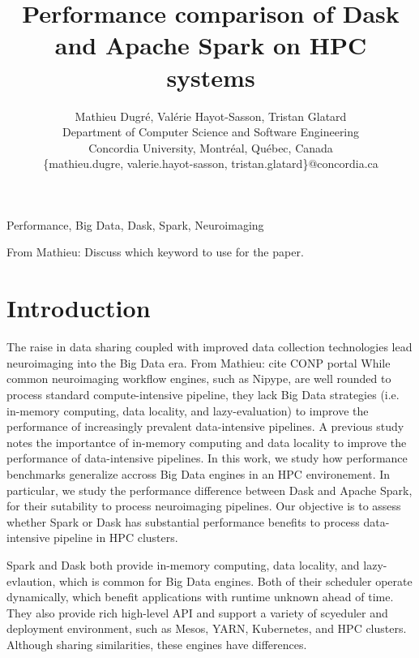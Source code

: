 \documentclass[conference]{IEEEtran}
\newcommand{\MD}[1]{\color{magenta}From Mathieu: #1 \color{black}}
\begin{document}
\title{Performance comparison of Dask and Apache Spark on HPC systems}

\author{Mathieu Dugr\'e, Val\'erie Hayot-Sasson, Tristan Glatard\\
	Department of Computer Science and Software Engineering\\
	Concordia University, Montr\'eal, Qu\'ebec, Canada\\
	\{mathieu.dugre, valerie.hayot-sasson, tristan.glatard\}@concordia.ca
	\vspace*{0.8cm} %
}

\maketitle

\begin{abstract}
\end{abstract}

\begin{IEEEkeywords}
	Performance, Big Data, Dask, Spark, Neuroimaging
\end{IEEEkeywords}
\MD{Discuss which keyword to use for the paper.}

\section{Introduction}
The raise in data sharing coupled with improved data collection technologies lead neuroimaging into the Big Data era\cite{ALFAROALMAGRO:18, van2014human}. \MD{cite CONP portal}
While common neuroimaging workflow engines, such as Nipype\cite{Nipype:11}, are well rounded to process standard compute-intensive pipeline,
they lack Big Data strategies (i.e. in-memory computing, data locality, and lazy-evaluation) to improve the performance of increasingly prevalent data-intensive pipelines.
A previous study\cite{hayot2019performance} notes the importantce of in-memory computing and data locality to improve the performance of data-intensive pipelines.
In this work, we study how performance benchmarks generalize accross Big Data engines in an HPC environement.
In particular, we study the performance difference between Dask\cite{Dask:15} and Apache Spark\cite{Spark:16}, for their sutability to process neuroimaging pipelines.
Our objective is to assess whether Spark or Dask has substantial performance benefits to process data-intensive pipeline in HPC clusters.

Spark and Dask both provide in-memory computing, data locality, and lazy-evlaution, which is common for Big Data engines.
Both of their scheduler operate dynamically, which benefit applications with runtime unknown ahead of time\cite{Dask:15}.
They also provide rich high-level API and support a variety of scyeduler and deployment environment, such as Mesos\cite{hindman2011mesos}, YARN\cite{vavilapalli2013apache}, Kubernetes, and HPC clusters.
Although sharing similarities, these engines have differences.
\end{document}
